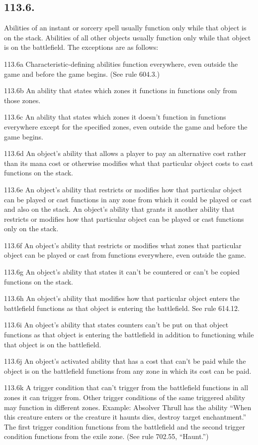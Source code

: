 \subsection*{113.6.}
Abilities of an instant or sorcery spell usually function only while that object is on the stack. Abilities of all other objects usually function only while that object is on the battlefield. The exceptions are as follows:

113.6a Characteristic-defining abilities function everywhere, even outside the game and before the game begins. (See rule 604.3.)

113.6b An ability that states which zones it functions in functions only from those zones.

113.6c An ability that states which zones it doesn’t function in functions everywhere except for the specified zones, even outside the game and before the game begins.

113.6d An object’s ability that allows a player to pay an alternative cost rather than its mana cost or otherwise modifies what that particular object costs to cast functions on the stack.

113.6e An object’s ability that restricts or modifies how that particular object can be played or cast functions in any zone from which it could be played or cast and also on the stack. An object’s ability that grants it another ability that restricts or modifies how that particular object can be played or cast functions only on the stack.

113.6f An object’s ability that restricts or modifies what zones that particular object can be played or cast from functions everywhere, even outside the game.

113.6g An object’s ability that states it can’t be countered or can’t be copied functions on the stack.

113.6h An object’s ability that modifies how that particular object enters the battlefield functions as that object is entering the battlefield. See rule 614.12.

113.6i An object’s ability that states counters can’t be put on that object functions as that object is entering the battlefield in addition to functioning while that object is on the battlefield.

113.6j An object’s activated ability that has a cost that can’t be paid while the object is on the battlefield functions from any zone in which its cost can be paid.

113.6k A trigger condition that can’t trigger from the battlefield functions in all zones it can trigger from. Other trigger conditions of the same triggered ability may function in different zones.
Example: Absolver Thrull has the ability “When this creature enters or the creature it haunts dies, destroy target enchantment.” The first trigger condition functions from the battlefield and the second trigger condition functions from the exile zone. (See rule 702.55, “Haunt.”)

